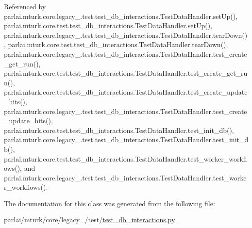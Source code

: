 Referenced by parlai.\+mturk.\+core.\+legacy\+\_.\+test.\+test\+\_\+db\+\_\+interactions.\+Test\+Data\+Handler.\+set\+Up(), parlai.\+mturk.\+core.\+test.\+test\+\_\+db\+\_\+interactions.\+Test\+Data\+Handler.\+set\+Up(), parlai.\+mturk.\+core.\+legacy\+\_.\+test.\+test\+\_\+db\+\_\+interactions.\+Test\+Data\+Handler.\+tear\+Down(), parlai.\+mturk.\+core.\+test.\+test\+\_\+db\+\_\+interactions.\+Test\+Data\+Handler.\+tear\+Down(), parlai.\+mturk.\+core.\+legacy\+\_.\+test.\+test\+\_\+db\+\_\+interactions.\+Test\+Data\+Handler.\+test\+\_\+create\+\_\+get\+\_\+run(), parlai.\+mturk.\+core.\+test.\+test\+\_\+db\+\_\+interactions.\+Test\+Data\+Handler.\+test\+\_\+create\+\_\+get\+\_\+run(), parlai.\+mturk.\+core.\+test.\+test\+\_\+db\+\_\+interactions.\+Test\+Data\+Handler.\+test\+\_\+create\+\_\+update\+\_\+hits(), parlai.\+mturk.\+core.\+legacy\+\_.\+test.\+test\+\_\+db\+\_\+interactions.\+Test\+Data\+Handler.\+test\+\_\+create\+\_\+update\+\_\+hits(), parlai.\+mturk.\+core.\+test.\+test\+\_\+db\+\_\+interactions.\+Test\+Data\+Handler.\+test\+\_\+init\+\_\+db(), parlai.\+mturk.\+core.\+legacy\+\_.\+test.\+test\+\_\+db\+\_\+interactions.\+Test\+Data\+Handler.\+test\+\_\+init\+\_\+db(), parlai.\+mturk.\+core.\+test.\+test\+\_\+db\+\_\+interactions.\+Test\+Data\+Handler.\+test\+\_\+worker\+\_\+workflows(), and parlai.\+mturk.\+core.\+legacy\+\_.\+test.\+test\+\_\+db\+\_\+interactions.\+Test\+Data\+Handler.\+test\+\_\+worker\+\_\+workflows().



The documentation for this class was generated from the following file\+:\begin{DoxyCompactItemize}
\item 
parlai/mturk/core/legacy\+\_/test/\hyperlink{legacy__2018_2test_2test__db__interactions_8py}{test\+\_\+db\+\_\+interactions.\+py}\end{DoxyCompactItemize}

